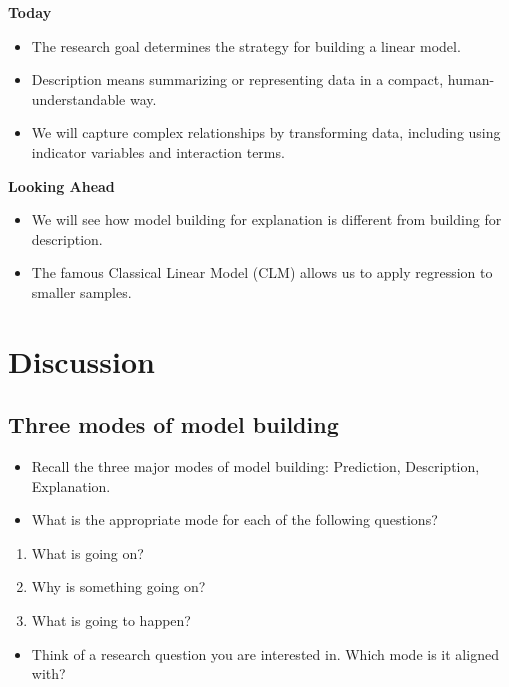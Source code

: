 \documentclass[
]{book}
\providecommand{\tightlist}{%
  \setlength{\itemsep}{0pt}\setlength{\parskip}{0pt}}
\theoremstyle{definition}
\theoremstyle{definition}
\theoremstyle{definition}
\theoremstyle{definition}
\theoremstyle{remark}
\begin{document}
\textbf{Today}

\begin{itemize}
\item
  The research goal determines the strategy for building a linear model.
\item
  Description means summarizing or representing data in a compact, human-understandable way.
\item
  We will capture complex relationships by transforming data, including using indicator variables and interaction terms.
\end{itemize}

\textbf{Looking Ahead}

\begin{itemize}
\item
  We will see how model building for explanation is different from building for description.
\item
  The famous Classical Linear Model (CLM) allows us to apply regression to smaller samples.
\end{itemize}

\hypertarget{discussion}{%
\section{Discussion}\label{discussion}}

\hypertarget{three-modes-of-model-building}{%
\subsection{Three modes of model building}\label{three-modes-of-model-building}}

\begin{itemize}
\tightlist
\item
  Recall the three major modes of model building: Prediction, Description, Explanation.
\item
  What is the appropriate mode for each of the following questions?
\end{itemize}

\begin{enumerate}
\def\labelenumi{\arabic{enumi}.}
\tightlist
\item
  What is going on?
\item
  Why is something going on?
\item
  What is going to happen?
\end{enumerate}

\begin{itemize}
\tightlist
\item
  Think of a research question you are interested in. Which mode is it aligned with?
\end{itemize}
\end{document}

